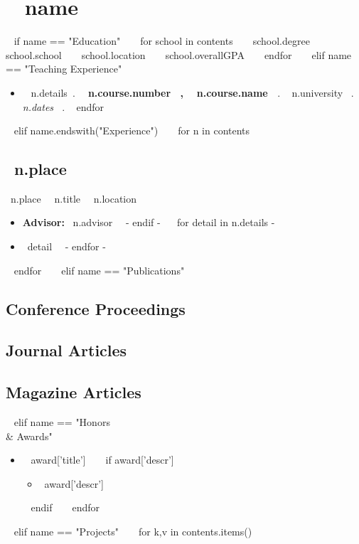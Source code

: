 \section{ ~{{ name }}~ }

~{ if name == "Education" }~
  ~{ for school in contents }~
      {~{{ school.degree }}~}%
      {~{{ school.school }}~}%
      {~{{ school.location }}~}%
      {~{{ school.overallGPA }}~}%
      {}
  ~{ endfor }~
~{ elif name == "Teaching Experience" }~
  \begin{itemize}
    ~{ for n in contents }~
      \item
        ~{{ n.details}}~.
        {\bf ~{{ n.course.number }}~, ~{{ n.course.name }}~}.
        ~{{ n.university }}~.
        {\it ~{{ n.dates }}~}.
    ~{ endfor }~
  \end{itemize}
~{ elif name.endswith("Experience") }~
  ~{ for n in contents }~
    \subsection{~{{n.place}}~}
      {~{{n.place}}~}%
      {~{{n.title}}~}%
      {~{{n.location}}~}%
      {}%
      {
        \begin{itemize}
        ~{ if n.advisor -}~
          \item {\bf Advisor:} ~{{n.advisor}}~
        ~{- endif -}~
        ~{ for detail in n.details -}~
          \item ~{{detail}}~
        ~{- endfor -}~
        \end{itemize}
      }
  ~{ endfor }~
~{ elif name == "Publications" }~
  \nocite{*}

  \subsection{Conference Proceedings}
  \printbibliography[heading=none,type=inproceedings,
    prefixnumbers=C]

  \subsection{Journal Articles}
  \printbibliography[heading=none,type=article,keyword=journal,
    resetnumbers=true,prefixnumbers=J]

  \subsection{Magazine Articles}
  \printbibliography[heading=none,type=article,keyword=magazine,
    resetnumbers=true,prefixnumbers=M]
~{ elif name == "Honors \\& Awards" }~
  \begin{itemize}
  ~{ for award in contents }~
    \item ~{{ award['title'] }}~
    ~{ if award['descr'] }~
      \begin{itemize}
      \item {~{{award['descr']}}~}
      \end{itemize}
    ~{ endif }~
  ~{ endfor }~
  \end{itemize}
~{ elif name == "Projects" }~
  ~{ for k,v in contents.items() }~
